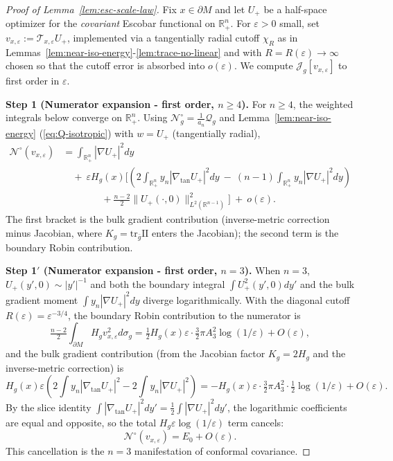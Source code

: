\documentclass[11pt,reqno,a4paper]{amsart}
\newcommand{\R}{\mathbb{R}}
\numberwithin{equation}{section}
\theoremstyle{plain}
\theoremstyle{remark}
\theoremstyle{plain}
\begin{document}
\begin{proof}[Proof of Lemma~\ref{lem:esc-scale-law}]
Fix $x\in\partial M$ and let $U_+$ be a half-space optimizer for the \emph{covariant} Escobar functional on $\R^n_+$. For $\varepsilon>0$ small, set $v_{x,\varepsilon}:=\mathcal T_{x,\varepsilon}U_+$, implemented via a tangentially radial cutoff $\chi_R$ as in Lemmas~\ref{lem:near-iso-energy}-\ref{lem:trace-no-linear} and with $R=R(\varepsilon)\to\infty$ chosen so that the cutoff error is absorbed into $o(\varepsilon)$. We compute $\mathcal J_g[v_{x,\varepsilon}]$ to first order in $\varepsilon$.


\medskip
\noindent\textbf{Step 1 (Numerator expansion - first order, $n\ge4$).}
For $n\ge4$, the weighted integrals below converge on $\R^n_+$.
Using $\mathcal N_g^\circ=\tfrac{1}{a_n}\mathcal Q_g$ and Lemma~\ref{lem:near-iso-energy} (\eqref{eq:Q-isotropic}) with $w=U_+$ (tangentially radial),
\begin{align}
\mathcal N^\circ(v_{x,\varepsilon})
&= \int_{\R^n_+}|\nabla U_+|^2dy \nonumber\\
&\quad +\ \varepsilon H_g(x)\Bigg[
\left(2\int_{\R^n_+} y_n|\nabla_{\tan}U_+|^2dy\ -\ (n-1)\int_{\R^n_+} y_n|\nabla U_+|^2dy\right) \nonumber\\
&\qquad\qquad + \frac{n-2}{2}\|U_+(\cdot,0)\|_{L^2(\R^{n-1})}^2\Bigg]
\ +\ o(\varepsilon). \label{eq:num-1-reprised}
\end{align}
The first bracket is the bulk gradient contribution (inverse-metric correction minus Jacobian, where $K_g=\mathrm{tr}_{\bar g}\mathrm{II}$
enters the Jacobian); the second term is the boundary Robin contribution.

\smallskip
\noindent\textbf{Step 1$'$ (Numerator expansion - first order, $n=3$).}
When $n=3$, $U_+(y',0)\sim|y'|^{-1}$ and both the boundary integral
$\int U_+^2(y',0)dy'$ and the bulk gradient moment $\int y_n|\nabla U_+|^2dy$
diverge logarithmically.
With the diagonal cutoff $R(\varepsilon)=\varepsilon^{-3/4}$, the boundary Robin
contribution to the numerator is
\[
\tfrac{n-2}{2}\int_{\partial M}H_gv_{x,\varepsilon}^2d\sigma_g
=\tfrac{1}{2}H_g(x)\varepsilon\cdot\tfrac{3}{2}\pi A_3^2\log(1/\varepsilon)+O(\varepsilon),
\]
and the bulk gradient contribution (from the Jacobian factor $K_g=2H_g$ and
the inverse-metric correction) is
\[
H_g(x)\varepsilon\left(2\int y_n|\nabla_{\mathrm{tan}}U_+|^2-2\int y_n|\nabla U_+|^2\right)
=-H_g(x)\varepsilon\cdot\tfrac{3}{2}\pi A_3^2\cdot\tfrac12\log(1/\varepsilon)+O(\varepsilon).
\]
By the slice identity $\int|\nabla_{\mathrm{tan}}U_+|^2dy'=\tfrac12\int|\nabla U_+|^2dy'$,
the logarithmic coefficients are equal and opposite, so the total $H_g\varepsilon\log(1/\varepsilon)$
term cancels:
\begin{equation}\label{eq:num-1-3d}
\mathcal N^\circ(v_{x,\varepsilon})
= E_0 + O(\varepsilon).
\end{equation}
This cancellation is the $n=3$ manifestation of conformal covariance.



\end{proof}
\end{document}
